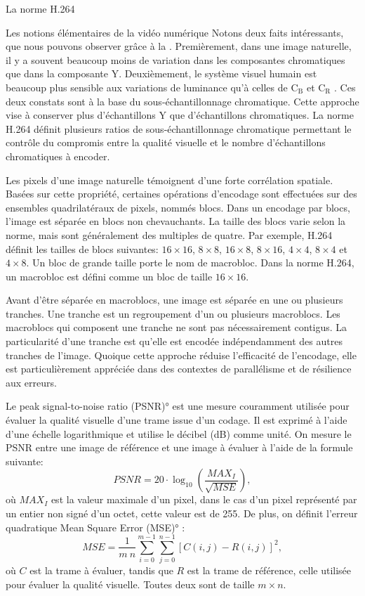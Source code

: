 \begin{chapter}{La norme H.264}
\begin{section}{Les notions élémentaires de la vidéo numérique}
Notons deux faits intéressants, que nous pouvons observer grâce à la
. Premièrement, dans une image naturelle, il y a souvent beaucoup
moins de variation dans les composantes chromatiques que dans la composante Y.
Deuxièmement, le système visuel humain est beaucoup plus sensible aux variations
de luminance qu'à celles de C$_{\text{B}}$ et C$_{\text{R}}$ \citep{Wang2001}.
Ces deux constats sont à la base du sous-échantillonnage chromatique. Cette
approche vise à conserver plus d'échantillons Y que d'échantillons chromatiques.
La norme H.264 définit plusieurs ratios de sous-échantillonnage chromatique
permettant le contrôle du compromis entre la qualité visuelle et le nombre
d'échantillons chromatiques à encoder.

Les pixels d'une image naturelle témoignent d'une forte corrélation spatiale.
Basées sur cette propriété, certaines opérations d'encodage sont effectuées sur
des ensembles quadrilatéraux de pixels, nommés blocs. Dans un encodage par
blocs, l'image est séparée en blocs non chevauchants. La taille des blocs varie
selon la norme, mais sont généralement des multiples de quatre. Par exemple,
H.264 définit les tailles de blocs suivantes: $16 \times 16$, $8 \times 8$, $16
\times 8$, $8 \times 16$, $4 \times 4$, $8 \times 4$ et $4 \times 8$. Un bloc de
grande taille porte le nom de macrobloc. Dans la norme H.264, un macrobloc est
défini comme un bloc de taille $16 \times 16$.

Avant d'être séparée en macroblocs, une image est séparée en une ou plusieurs
tranches. Une tranche est un regroupement d'un ou plusieurs macroblocs. Les
macroblocs qui composent une tranche ne sont pas nécessairement contigus. La
particularité d'une tranche est qu'elle est encodée indépendamment des autres
tranches de l'image. Quoique cette approche réduise l'efficacité de l'encodage,
elle est particulièrement appréciée dans des contextes de parallélisme et de
résilience aux erreurs.

Le \ang{peak signal-to-noise ratio (PSNR)} est une mesure couramment utilisée
pour évaluer la qualité visuelle d'une trame issue d'un codage. Il est exprimé à
l'aide d'une échelle logarithmique et utilise le décibel (dB) comme unité. On
mesure le PSNR entre une image de référence et une image à évaluer à l'aide de
la formule suivante:
\begin{equation}
\label{eq-PSNR}
PSNR = 20 \cdot \log_{10} \left( \frac{MAX_I}{\sqrt{MSE}}\right),
\end{equation}
où $MAX_I$ est la valeur maximale d'un pixel, dans le cas d'un pixel représenté
par un entier non signé d'un octet, cette valeur est de 255. De plus, on définit
l'erreur quadratique \ang{Mean Square Error (MSE)} :
\begin{equation}
\label{eq-MSE}
MSE = \frac{1}{m~n} \sum_{i=0}^{m-1}\sum_{j=0}^{n-1}  \left[ C(i,j) - R(i,j)
\right]^2,
\end{equation}
où $C$ est la trame à évaluer, tandis que $R$ est la trame de référence, celle
utilisée pour évaluer la qualité visuelle. Toutes deux sont de taille $m \times
n$.


\end{section}
\end{chapter}
